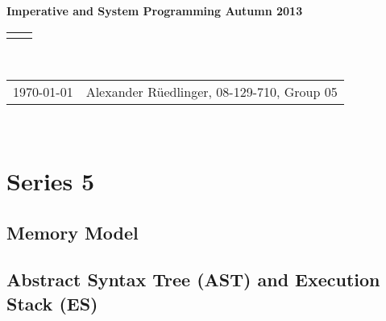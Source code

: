 \documentclass[12pt]{article}
\renewcommand{\title}[1]{\textbf{#1}\\}
\renewcommand{\line}{\begin{tabularx}{\textwidth}{X>{\raggedleft}X}\hline\\\end{tabularx}\\[-0.5cm]}
\newcommand{\leftright}[2]{\begin{tabularx}{\textwidth}{X>{\raggedleft}X}#1%
& #2\\\end{tabularx}\\[-0.5cm]}
\begin{document}
\title{Imperative and System Programming Autumn 2013}
\line
\leftright{\today}{Alexander Rüedlinger, 08-129-710, Group 05} %
\section*{Series 5}
\subsection*{Memory Model}

\subsection*{Abstract Syntax Tree (AST) and Execution Stack (ES)}
\end{document}
